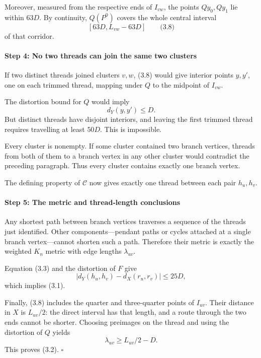 \documentclass[
  11pt,
  a4paper,
]{article}
\newcounter{none} %
\begin{document}
Moreover, measured from the respective ends of \(I_{vw}\), the points
\(Qy_0,Qy_1\) lie within \(63D\). By continuity, \(Q(P^0)\) covers the
whole central interval \[
[63D,L_{vw}-63D]
\qquad\text{(3.8)}
\] of that corridor.

\paragraph{Step 4: No two threads can join the same two
clusters}\label{step-4-no-two-threads-can-join-the-same-two-clusters}

If two distinct threads joined clusters \(v,w\), (3.8) would give
interior points \(y,y'\), one on each trimmed thread, mapping under
\(Q\) to the midpoint of \(I_{vw}\).

The distortion bound for \(Q\) would imply \[
d_Y(y,y')\le D.
\] But distinct threads have disjoint interiors, and leaving the first
trimmed thread requires travelling at least \(50D\). This is impossible.

Every cluster is nonempty. If some cluster contained two branch
vertices, threads from both of them to a branch vertex in any other
cluster would contradict the preceding paragraph. Thus every cluster
contains exactly one branch vertex.

The defining property of \(\mathcal C\) now gives exactly one thread
between each pair \(h_u,h_v\).

\paragraph{Step 5: The metric and thread-length
conclusions}\label{step-5-the-metric-and-thread-length-conclusions}

Any shortest path between branch vertices traverses a sequence of the
threads just identified. Other components---pendant paths or cycles
attached at a single branch vertex---cannot shorten such a path.
Therefore their metric is exactly the weighted \(K_n\) metric with edge
lengths \(\lambda_{uv}\).

Equation (3.3) and the distortion of \(F\) give \[
|d_Y(h_u,h_v)-d_X(r_u,r_v)|\le25D,
\] which implies (3.1).

Finally, (3.8) includes the quarter and three-quarter points of
\(I_{uv}\). Their distance in \(X\) is \(L_{uv}/2\): the direct interval
has that length, and a route through the two ends cannot be shorter.
Choosing preimages on the thread and using the distortion of \(Q\)
yields \[
\lambda_{uv}\ge L_{uv}/2-D.
\] This proves (3.2). \(\square\)
\end{document}
